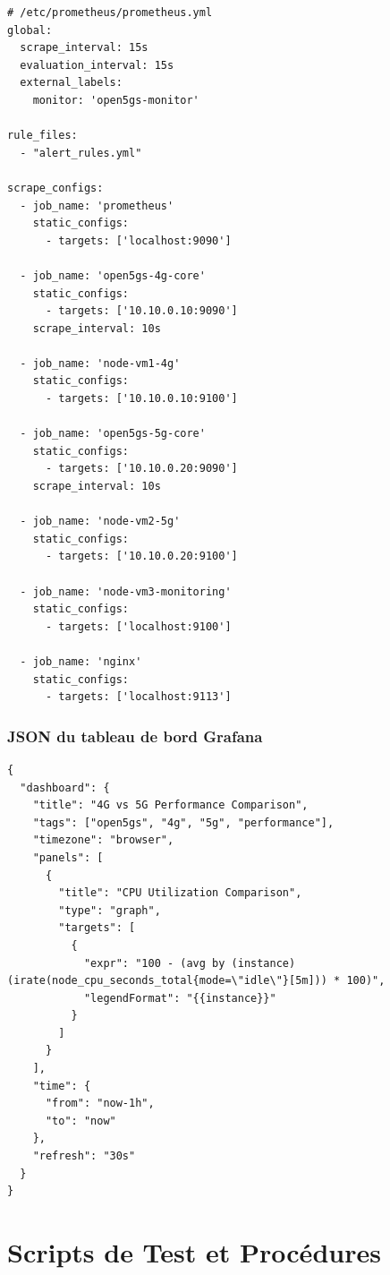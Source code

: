 \documentclass[12pt,a4paper]{report}
\begin{document}
\begin{lstlisting}[caption=Configuration compléte de Prometheus]
# /etc/prometheus/prometheus.yml
global:
  scrape_interval: 15s
  evaluation_interval: 15s
  external_labels:
    monitor: 'open5gs-monitor'

rule_files:
  - "alert_rules.yml"

scrape_configs:
  - job_name: 'prometheus'
    static_configs:
      - targets: ['localhost:9090']

  - job_name: 'open5gs-4g-core'
    static_configs:
      - targets: ['10.10.0.10:9090']
    scrape_interval: 10s

  - job_name: 'node-vm1-4g'
    static_configs:
      - targets: ['10.10.0.10:9100']

  - job_name: 'open5gs-5g-core'
    static_configs:
      - targets: ['10.10.0.20:9090']
    scrape_interval: 10s

  - job_name: 'node-vm2-5g'
    static_configs:
      - targets: ['10.10.0.20:9100']

  - job_name: 'node-vm3-monitoring'
    static_configs:
      - targets: ['localhost:9100']

  - job_name: 'nginx'
    static_configs:
      - targets: ['localhost:9113']
\end{lstlisting}

\subsection{JSON du tableau de bord Grafana}

\begin{lstlisting}[caption=Structure du tableau de bord Grafana]
{
  "dashboard": {
    "title": "4G vs 5G Performance Comparison",
    "tags": ["open5gs", "4g", "5g", "performance"],
    "timezone": "browser",
    "panels": [
      {
        "title": "CPU Utilization Comparison",
        "type": "graph",
        "targets": [
          {
            "expr": "100 - (avg by (instance) (irate(node_cpu_seconds_total{mode=\"idle\"}[5m])) * 100)",
            "legendFormat": "{{instance}}"
          }
        ]
      }
    ],
    "time": {
      "from": "now-1h",
      "to": "now"
    },
    "refresh": "30s"
  }
}
\end{lstlisting}

\chapter{Scripts de Test et Procédures}
\end{document}
